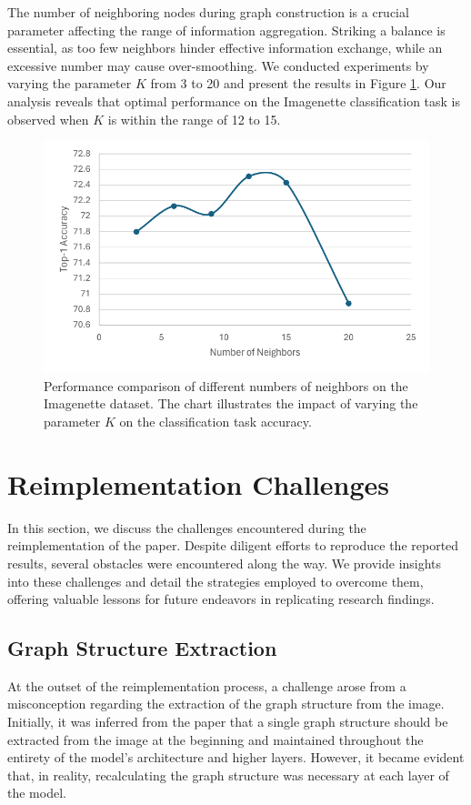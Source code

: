 \documentclass[sigconf, nonacm]{acmart}
\begin{document}
The number of neighboring nodes during graph construction is a crucial parameter affecting the range of information aggregation. Striking a balance is essential, as too few neighbors hinder effective information exchange, while an excessive number may cause over-smoothing. We conducted experiments by varying the parameter \( K \) from 3 to 20 and present the results in Figure \ref{fig:num_neighbor_chart}. Our analysis reveals that optimal performance on the Imagenette classification task is observed when \( K \) is within the range of 12 to 15.

\begin{figure}[t]
  \centering
  \includegraphics[width=\linewidth]{figures/num_neighbor_chart.pdf}
  \caption{Performance comparison of different numbers of neighbors on the Imagenette dataset. The chart illustrates the impact of varying the parameter \( K \) on the classification task accuracy.}
  \label{fig:num_neighbor_chart}
\end{figure}

\section{Reimplementation Challenges}
In this section, we discuss the challenges encountered during the reimplementation of the paper. Despite diligent efforts to reproduce the reported results, several obstacles were encountered along the way. We provide insights into these challenges and detail the strategies employed to overcome them, offering valuable lessons for future endeavors in replicating research findings.

\subsection{Graph Structure Extraction}
At the outset of the reimplementation process, a challenge arose from a misconception regarding the extraction of the graph structure from the image. Initially, it was inferred from the paper that a single graph structure should be extracted from the image at the beginning and maintained throughout the entirety of the model's architecture and higher layers. However, it became evident that, in reality, recalculating the graph structure was necessary at each layer of the model.
\end{document}
